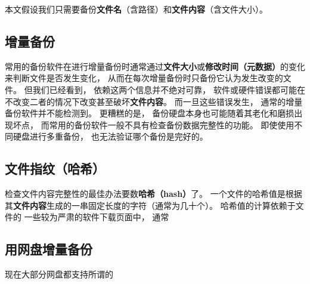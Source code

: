 本文假设我们只需要备份\textbf{文件名}（含路径）和\textbf{文件内容}（含文件大小）。

\subsection{增量备份}
常用的备份软件在进行增量备份时通常通过\textbf{文件大小}或\textbf{修改时间（元数据）}的变化来判断文件是否发生变化， 从而在每次增量备份时只备份它认为发生改变的文件。 但我们已经看到， 依赖这两个信息并不绝对可靠， 软件或硬件错误都可能在不改变二者的情况下改变甚至破坏\textbf{文件内容}。 而一旦这些错误发生， 通常的增量备份软件并不能检测到。 更糟糕的是， 备份硬盘本身也可能随着其老化和磨损出现坏点， 而常用的备份软件一般不具有检查备份数据完整性的功能。 即使使用不同硬盘进行多重备份， 也无法验证哪个备份是完好的。

\subsection{文件指纹（哈希）}
检查文件内容完整性的最佳办法要数\textbf{哈希（hash）}了。 一个文件的哈希值是根据其\textbf{文件内容}生成的一串固定长度的字符（通常为几十个）。 哈希值的计算依赖于文件的 一些较为严肃的软件下载页面中， 通常

\subsection{用网盘增量备份}
现在大部分网盘都支持所谓的

